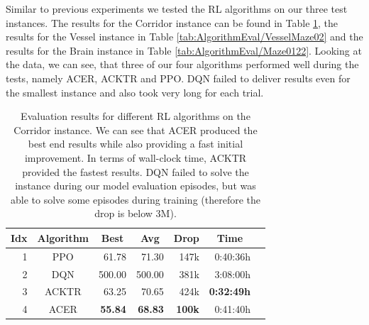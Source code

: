 Similar to previous experiments we tested the RL algorithms on our three test instances. The results for the Corridor instance can be found in Table \ref{tab:AlgorithmEval/Maze0318}, the results for the Vessel instance in Table \ref{tab:AlgorithmEval/VesselMaze02} and the results for the Brain instance in Table \ref{tab:AlgorithmEval/Maze0122}. Looking at the data, we can see, that three of our four algorithms performed well during the tests, namely ACER, ACKTR and PPO. DQN failed to deliver results even for the smallest instance and also took very long for each trial.

\begin{table}[htp]
    \begin{center}
        \begin{tabular}{rcrrrrr}
            \toprule
            \multicolumn{1}{c}{Idx} & \multicolumn{1}{c}{Algorithm} & \multicolumn{1}{c}{Best} & \multicolumn{1}{c}{Avg} & \multicolumn{1}{c}{Drop} & \multicolumn{1}{c}{Time}\\
            \midrule
            1 & PPO & 61.78 & 71.30 & 147k & 0:40:36h \\
            2 & DQN & 500.00 & 500.00 & 381k & 3:08:00h \\
            3 & ACKTR & 63.25 & 70.65 & 424k & \textbf{0:32:49h} \\
            4 & ACER & \textbf{55.84} & \textbf{68.83} & \textbf{100k} & 0:41:40h \\
            \bottomrule
        \end{tabular}
    \end{center}
    \caption[Evaluation of RL Algorithms on the Corridor Instance]{Evaluation results for different RL algorithms on the Corridor instance. We can see that ACER produced the best end results while also providing a fast initial improvement. In terms of wall-clock time, ACKTR provided the fastest results. DQN failed to solve the instance during our model evaluation episodes, but was able to solve some episodes during training (therefore the drop is below 3M).} \label{tab:AlgorithmEval/Maze0318}
\end{table}

